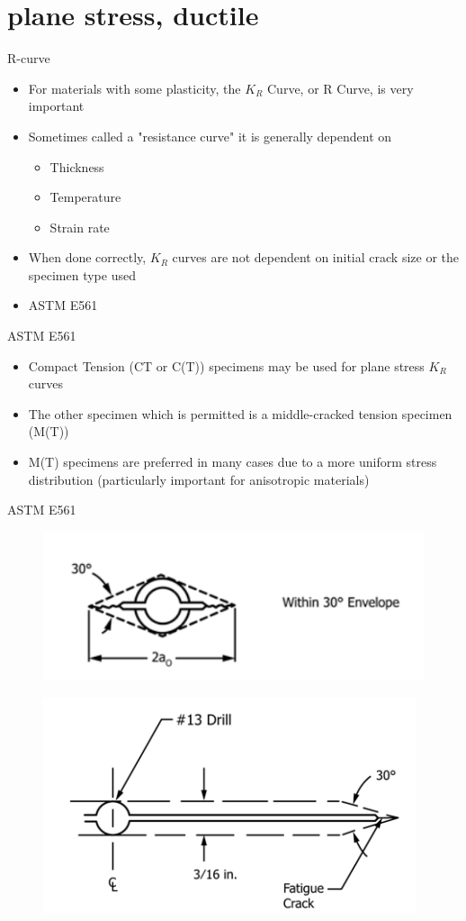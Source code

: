 \documentclass[10pt]{beamer}
\begin{document}
\section{plane stress, ductile}

\begin{frame}{R-curve}
	\begin{itemize}[<+->]
		\item For materials with some plasticity, the $K_R$ Curve, or R Curve, is very important
		\item Sometimes called a "resistance curve" it is generally dependent on
		\begin{itemize}[<+->]
			\item Thickness
			\item Temperature
			\item Strain rate
		\end{itemize}
		\item When done correctly, $K_R$ curves are not dependent on initial crack size or the specimen type used
		\item ASTM E561
	\end{itemize}
\end{frame}

\begin{frame}{ASTM E561}
	\begin{itemize}[<+->]
		\item Compact Tension (CT or C(T)) specimens may be used for plane stress $K_R$ curves
		\item The other specimen which is permitted is a middle-cracked tension specimen (M(T))
		\item M(T) specimens are preferred in many cases due to a more uniform stress distribution (particularly important for anisotropic materials)
	\end{itemize}
\end{frame}

\begin{frame}{ASTM E561}
	
\begin{figure}
\centering
\includegraphics[width=0.5\linewidth]{MT-envelope}
\label{fig:MT-envelope}
\end{figure}
\begin{figure}
\centering
\includegraphics[width=0.6\linewidth]{MT-notch}
\label{fig:MT-notch}
\end{figure}

\end{frame}
\end{document}
